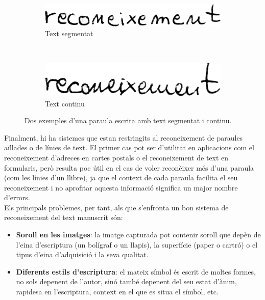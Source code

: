 \begin{figure}
\centering
\begin{subfigure}[b]{0.4\textwidth}
\centering
\includegraphics[width=\textwidth]{images/reconeixement_segmentat.eps}
\caption{Text segmentat}\label{fig:text_segmentat}
\end{subfigure}
~
\begin{subfigure}[b]{0.4\textwidth}
\centering
\includegraphics[width=\textwidth]{images/reconeixement_continu.eps}
\caption{Text continu}\label{fig:text_continu}
\end{subfigure}
\caption{Dos exemples d'una paraula escrita amb text segmentat i continu.}
\end{figure}

Finalment, hi ha sistemes que estan restringits al reconeixement de paraules aïllades o de línies de text. El primer cas pot ser d'utilitat en aplicacions com el reconeixement d'adreces en cartes postals o el reconeixement de text en formularis, però resulta poc útil en el cas de voler reconèixer més d'una paraula (com les línies d'un llibre), ja que el context de cada paraula facilita el seu reconeixement i no aprofitar aquesta informació significa un major nombre d'errors.\\

Els principals problemes, per tant, als que s'enfronta un bon sistema de reconeixement del text manuscrit són:
\begin{itemize}
\item \textbf{Soroll en les imatges}: la imatge capturada pot contenir soroll que depèn de l'eina d'escriptura (un bolígraf o un llapis), la superfície (paper o cartró) o el tipus d'eina d'adquisició i la seva qualitat.
\item \textbf{Diferents estils d'escriptura}: el mateix símbol és escrit de moltes formes, no sols depenent de l'autor, sinó també depenent del seu estat d'ànim, rapidesa en l'escriptura, context en el que es situa el símbol, etc.
\end{itemize}

